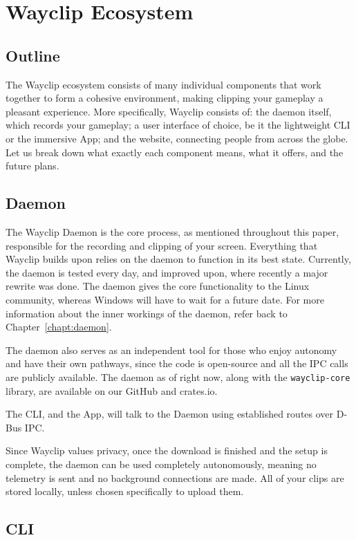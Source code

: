 \chapter{Wayclip Ecosystem}

\section{Outline}

The Wayclip ecosystem consists of many individual components that work together to form a cohesive environment, making clipping your gameplay a pleasant experience.
More specifically, Wayclip consists of: the daemon itself, which records your gameplay; a user interface of choice, be it the lightweight CLI or the immersive App; and the website, connecting people from across the globe.
Let us break down what exactly each component means, what it offers, and the future plans.

\section{Daemon}

The Wayclip Daemon is the core process, as mentioned throughout this paper, responsible for the recording and clipping of your screen.
Everything that Wayclip builds upon relies on the daemon to function in its best state. Currently, the daemon is tested every day, and improved upon, where recently a major rewrite was done.
The daemon gives the core functionality to the Linux community, whereas Windows will have to wait for a future date. For more information about the inner workings of the daemon, refer back to Chapter~\ref{chapt:daemon}.

The daemon also serves as an independent tool for those who enjoy autonomy and have their own pathways, since the code is open-source and all the IPC calls are publicly available.
The daemon as of right now, along with the \lstinline|wayclip-core| library, are available on our GitHub and crates.io.

The CLI, and the App, will talk to the Daemon using established routes over D-Bus IPC.

Since Wayclip values privacy, once the download is finished and the setup is complete, the daemon can be used completely autonomously, meaning no telemetry is sent and no background connections are made.
All of your clips are stored locally, unless chosen specifically to upload them.

\section{CLI}

